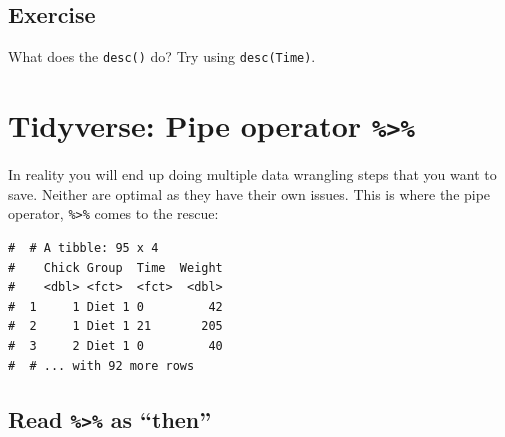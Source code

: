 \documentclass[a4paper,9pt,twocolumn,twoside,printwatermark=false]{pinp}
\begin{document}
\subsection{Exercise}\label{exercise-7}

What does the \texttt{desc()} do? Try using \texttt{desc(Time)}.

\section{\texorpdfstring{Tidyverse: Pipe operator
\texttt{\%\textgreater{}\%}}{Tidyverse: Pipe operator \%\textgreater{}\%}}\label{tidyverse-pipe-operator}

In reality you will end up doing multiple data wrangling steps that you
want to save. Neither are optimal as they have their own issues. This is
where the pipe operator, \texttt{\%\textgreater{}\%} comes to the
rescue:

\begin{Shaded}
\end{Shaded}

\begin{ShadedResult}
\begin{verbatim}
#  # A tibble: 95 x 4
#    Chick Group  Time  Weight
#    <dbl> <fct>  <fct>  <dbl>
#  1     1 Diet 1 0         42
#  2     1 Diet 1 21       205
#  3     2 Diet 1 0         40
#  # ... with 92 more rows
\end{verbatim}
\end{ShadedResult}

\subsection{\texorpdfstring{Read \texttt{\%\textgreater{}\%} as
``then''}{Read \%\textgreater{}\% as then}}\label{read-as-then}
\end{document}
